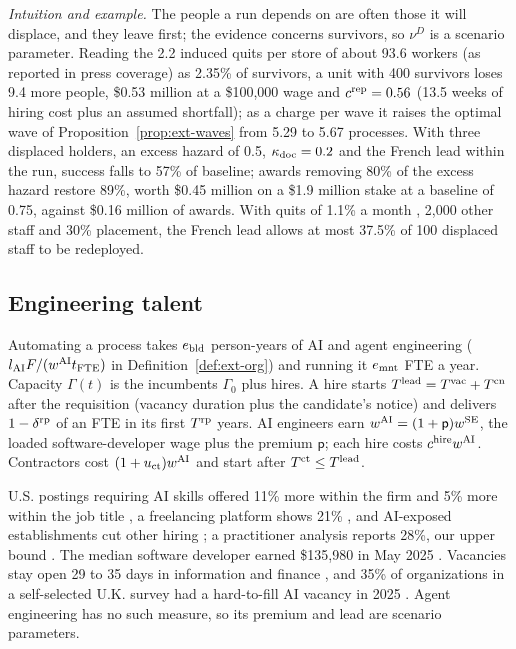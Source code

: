 \noindent\emph{Intuition and example.} The people a run depends on are often those it will displace, and they leave first; the evidence concerns survivors, so $\nu^D$ is a scenario parameter. Reading the 2.2 induced quits per store of about 93.6 workers (as reported in press coverage) as 2.35\% of survivors, a unit with 400 survivors loses 9.4 more people, \$0.53 million at a \$100{,}000 wage and $c^{\rm rep}=0.56$ (13.5 weeks of hiring cost plus an assumed shortfall); as a charge per wave it raises the optimal wave of Proposition~\ref{prop:ext-waves} from 5.29 to 5.67 processes. With three displaced holders, an excess hazard of 0.5, $\kappa_{\rm doc}=0.2$ and the French lead within the run, success falls to 57\% of baseline; awards removing 80\% of the excess hazard restore 89\%, worth \$0.45 million on a \$1.9 million stake at a baseline of 0.75, against \$0.16 million of awards. With quits of 1.1\% a month \citep{bls2026jolts}, 2,000 other staff and 30\% placement, the French lead allows at most 37.5\% of 100 displaced staff to be redeployed.

\subsection{Engineering talent}\label{sec:labor-talent}

\begin{assumption}\label{ass:labor-talent}
Automating a process takes $e_{\rm bld}$ person-years of AI and agent engineering ($l_{\rm AI}F/(w^{\rm AI}t_{\rm FTE})$ in Definition~\ref{def:ext-org}) and running it $e_{\rm mnt}$ FTE a year. Capacity $\Gamma(t)$ is the incumbents $\Gamma_0$ plus hires. A hire starts $T^{\rm lead}=T^{\rm vac}+T^{\rm cn}$ after the requisition (vacancy duration plus the candidate's notice) and delivers $1-\delta^{\rm rp}$ of an FTE in its first $T^{\rm rp}$ years. AI engineers earn $w^{\rm AI}=(1+\mathsf p)w^{\rm SE}$, the loaded software-developer wage plus the premium $\mathsf p$; each hire costs $c^{\rm hire}w^{\rm AI}$. Contractors cost $(1+u_{\rm ct})w^{\rm AI}$ and start after $T^{\rm ct}\le T^{\rm lead}$.
\end{assumption}

U.S. postings requiring AI skills offered 11\% more within the firm and 5\% more within the job title \citep{alekseeva2021demand}, a freelancing platform shows 21\% \citep{stephany2024what}, and AI-exposed establishments cut other hiring \citep{acemoglu2022artificial}; a practitioner analysis reports 28\%, our upper bound \citep{lightcast2025beyond}. The median software developer earned \$135{,}980 in May 2025 \citep{bls2026oewsdev}. Vacancies stay open 29 to 35 days in information and finance \citep{davis2013establishment}, and 35\% of organizations in a self-selected U.K. survey had a hard-to-fill AI vacancy in 2025 \citep{dsit2025ai}. Agent engineering has no such measure, so its premium and lead are scenario parameters.

